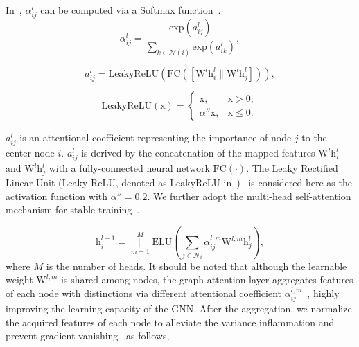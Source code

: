 In~, $\alpha_{i j}^{l}$ can be computed via a Softmax function~\citep{bridle1989training}.
\begin{equation}
	\alpha_{i j}^{l}=\frac{\mathrm{exp}\left(a_{i j}^{l}\right)}{\sum\limits_{k \in \mathcal{N}(i)} \mathrm{exp}\left(a_{i k}^{l}\right)},
	\label{softmax}
\end{equation}

\begin{equation}
	a_{i j}^{l}=\mathrm{LeakyReLU}\left({\mathrm{FC}}\left(\left[\boldsymbol{\mathrm W}^{l} \boldsymbol{\mathrm h}_{i}^{l} \| \boldsymbol{\mathrm W}^{l} \boldsymbol{\mathrm h}_{j}^{l}\right]\right)\right),
	\label{concat}
\end{equation}

\begin{equation}
	\mathrm{LeakyReLU}(\boldsymbol{\mathrm x})= \begin{cases}\boldsymbol{\mathrm x}, & \boldsymbol{\mathrm x}>0; \\ \alpha'' \boldsymbol{\mathrm x}, & \boldsymbol{\mathrm x} \leqslant 0.\end{cases}
	\label{LeakyReLU}
\end{equation}

\indent$a_{i j}^{l}$ is an attentional coefficient representing the importance of node $j$ to the center node $i$. $a_{i j}^{l}$ is derived by the concatenation of the mapped features $\boldsymbol{\mathrm W}^{l} \boldsymbol{\mathrm h}_{i}^{l}$ and $\boldsymbol{\mathrm W}^{l} \boldsymbol{\mathrm h}_{j}^{l}$ with a fully-connected neural network ${\mathrm{FC}}(\cdot)$. The Leaky Rectified Linear Unit (Leaky ReLU, denoted as $\mathrm{LeakyReLU}$ in~)~\citep{maas2013rectifier} is considered here as the activation function with $\alpha''=0.2$. We further adopt the multi-head self-attention mechanism for stable training~\citep{velickovic2018graph}.

\begin{equation}
	\boldsymbol{\mathrm h}_{i}^{l+1}=\mathop{\|}\limits_{m=1}^{M} \mathrm{ELU}\left(\sum_{j\in\mathcal{N}_{i}} \alpha_{i j}^{l, m} \boldsymbol{\mathrm W}^{l, m} \boldsymbol{\mathrm h}_{j}^{l}\right),
\end{equation}
where $M$ is the number of heads. It should be noted that although the learnable weight $\boldsymbol{\mathrm W}^{l, m}$ is shared among nodes, the graph attention layer aggregates features of each node with distinctions via different attentional coefficient $\alpha_{i j}^{l, m}$~\citep{velickovic2018graph}, highly improving the learning capacity of the GNN. After the aggregation, we normalize the acquired features of each node to alleviate the variance inflammation and prevent gradient vanishing~\citep{zhou2021understanding} as follows,

